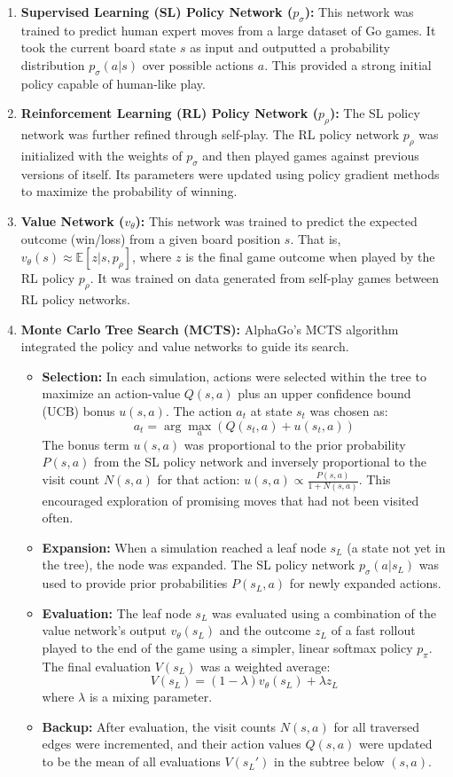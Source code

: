 \documentclass[11pt,a4paper]{article}
\begin{document}
\begin{enumerate}
    \item \textbf{Supervised Learning (SL) Policy Network ($p_{\sigma}$):} This network was trained to predict human expert moves from a large dataset of Go games. It took the current board state $s$ as input and outputted a probability distribution $p_{\sigma}(a|s)$ over possible actions $a$. This provided a strong initial policy capable of human-like play.
    \item \textbf{Reinforcement Learning (RL) Policy Network ($p_{\rho}$):} The SL policy network was further refined through self-play. The RL policy network $p_{\rho}$ was initialized with the weights of $p_{\sigma}$ and then played games against previous versions of itself. Its parameters were updated using policy gradient methods to maximize the probability of winning.
    \item \textbf{Value Network ($v_{\theta}$):} This network was trained to predict the expected outcome (win/loss) from a given board position $s$. That is, $v_{\theta}(s) \approx \mathbb{E}[z|s, p_{\rho}]$, where $z$ is the final game outcome when played by the RL policy $p_{\rho}$. It was trained on data generated from self-play games between RL policy networks.
    \item \textbf{Monte Carlo Tree Search (MCTS):} AlphaGo's MCTS algorithm integrated the policy and value networks to guide its search.
    \begin{itemize}
        \item \textbf{Selection:} In each simulation, actions were selected within the tree to maximize an action-value $Q(s,a)$ plus an upper confidence bound (UCB) bonus $u(s,a)$. The action $a_t$ at state $s_t$ was chosen as:
        \[ a_t = \arg\max_a (Q(s_t,a) + u(s_t,a)) \]
        The bonus term $u(s,a)$ was proportional to the prior probability $P(s,a)$ from the SL policy network and inversely proportional to the visit count $N(s,a)$ for that action: $u(s,a) \propto \frac{P(s,a)}{1+N(s,a)}$. This encouraged exploration of promising moves that had not been visited often.
        \item \textbf{Expansion:} When a simulation reached a leaf node $s_L$ (a state not yet in the tree), the node was expanded. The SL policy network $p_\sigma(a|s_L)$ was used to provide prior probabilities $P(s_L,a)$ for newly expanded actions.
        \item \textbf{Evaluation:} The leaf node $s_L$ was evaluated using a combination of the value network's output $v_{\theta}(s_L)$ and the outcome $z_L$ of a fast rollout played to the end of the game using a simpler, linear softmax policy $p_{\pi}$. The final evaluation $V(s_L)$ was a weighted average:
        \[ V(s_L) = (1-\lambda)v_{\theta}(s_L) + \lambda z_L \]
        where $\lambda$ is a mixing parameter.
        \item \textbf{Backup:} After evaluation, the visit counts $N(s,a)$ for all traversed edges were incremented, and their action values $Q(s,a)$ were updated to be the mean of all evaluations $V(s_L')$ in the subtree below $(s,a)$.
    \end{itemize}
\end{enumerate}
\end{document}
